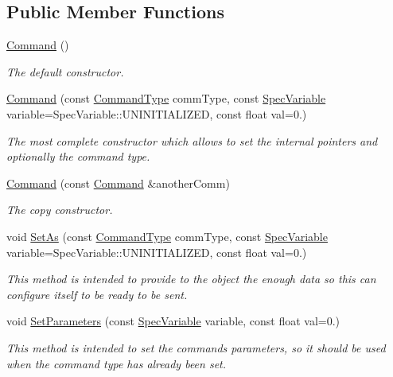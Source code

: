 \subsection*{Public Member Functions}
\begin{DoxyCompactItemize}
\item 
\hyperlink{classCommand_a18df2d81039392daeb0b78c346a70537}{Command} ()
\begin{DoxyCompactList}\small\item\em The default constructor. \end{DoxyCompactList}\item 
\hyperlink{classCommand_aa092997d602d3e2e4d0036ce2d4853c6}{Command} (const \hyperlink{classCommand_a658ae4be30c6dd9b673e467908acaeb5}{Command\+Type} comm\+Type, const \hyperlink{Spectran_8h_a0411392c90f0c8f0d8e44a4e94259276}{Spec\+Variable} variable=Spec\+Variable\+::\+U\+N\+I\+N\+I\+T\+I\+A\+L\+I\+Z\+ED, const float val=0.)
\begin{DoxyCompactList}\small\item\em The most complete constructor which allows to set the internal pointers and optionally the command type. \end{DoxyCompactList}\item 
\hyperlink{classCommand_a8a7c0c91424400c15b4ce0ce92ce3064}{Command} (const \hyperlink{classCommand}{Command} \&another\+Comm)
\begin{DoxyCompactList}\small\item\em The copy constructor. \end{DoxyCompactList}\item 
void \hyperlink{classCommand_ab49af30836fbeb1ec43a9814132889c8}{Set\+As} (const \hyperlink{classCommand_a658ae4be30c6dd9b673e467908acaeb5}{Command\+Type} comm\+Type, const \hyperlink{Spectran_8h_a0411392c90f0c8f0d8e44a4e94259276}{Spec\+Variable} variable=Spec\+Variable\+::\+U\+N\+I\+N\+I\+T\+I\+A\+L\+I\+Z\+ED, const float val=0.)
\begin{DoxyCompactList}\small\item\em This method is intended to provide to the object the enough data so this can configure itself to be ready to be sent. \end{DoxyCompactList}\item 
void \hyperlink{classCommand_a11e0a357319d12c7c29d41c1b6fcfbd6}{Set\+Parameters} (const \hyperlink{Spectran_8h_a0411392c90f0c8f0d8e44a4e94259276}{Spec\+Variable} variable, const float val=0.)
\begin{DoxyCompactList}\small\item\em This method is intended to set the command\textquotesingle{}s parameters, so it should be used when the command type has already been set. \end{DoxyCompactList}\item 

\end{DoxyCompactItemize}
